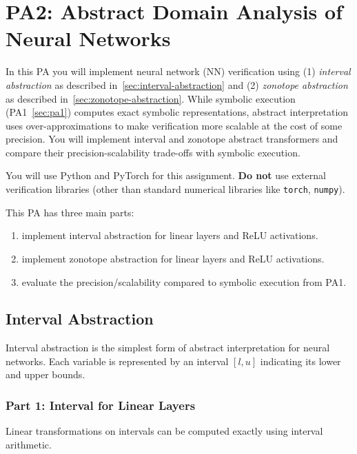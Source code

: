 \section{PA2: Abstract Domain Analysis of Neural Networks}\label{sec:pa2}

In this PA you will implement neural network (NN) verification using (1) \emph{interval abstraction} as described in~\autoref{sec:interval-abstraction} and (2) \emph{zonotope abstraction} as described in~\autoref{sec:zonotope-abstraction}. 
While symbolic execution (PA1~\autoref{sec:pa1}) computes exact symbolic representations, abstract interpretation uses over-approximations to make verification more scalable at the cost of some precision. You will implement interval and zonotope abstract transformers and compare their precision-scalability trade-offs with symbolic execution.

You will use Python and PyTorch for this assignment. \textbf{Do not} use external verification libraries (other than standard numerical libraries like \texttt{torch}, \texttt{numpy}).

This PA has three main parts: 
\begin{enumerate}
    \item implement interval abstraction for linear layers and ReLU activations.
    \item implement zonotope abstraction for linear layers and ReLU activations.
    \item evaluate the precision/scalability compared to symbolic execution from PA1.
\end{enumerate}

\subsection{Interval Abstraction}

Interval abstraction is the simplest form of abstract interpretation for neural networks. Each variable is represented by an interval $[l, u]$ indicating its lower and upper bounds.

\subsubsection{Part 1: Interval for Linear Layers}

Linear transformations on intervals can be computed exactly using interval arithmetic.


